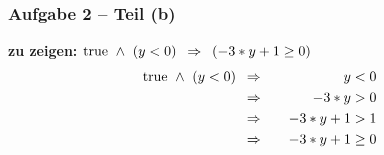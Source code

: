 \documentclass{beamer}
\begin{document}
\begin{frame} \frametitle{Aufgabe 2 -- Teil (b)}
	\begin{center}
		\textbf{zu zeigen:} $\text{true} \ \land \ (y < 0) \enskip \Rightarrow \enskip (-3 * y + 1 \ge 0)$
		\pause
		\begin{alignat*}{2}
			\text{true} \ \land \ (y < 0) \enskip &\Rightarrow \quad &y &< 0 \\
			&\Rightarrow \quad &-3 * y &> 0 \\ 
			&\Rightarrow \quad &-3 * y + 1 &> 1 \\ 
			&\Rightarrow \quad &-3 * y + 1 &\ge 0 
		\end{alignat*}
	\end{center}
\end{frame}
\end{document}
